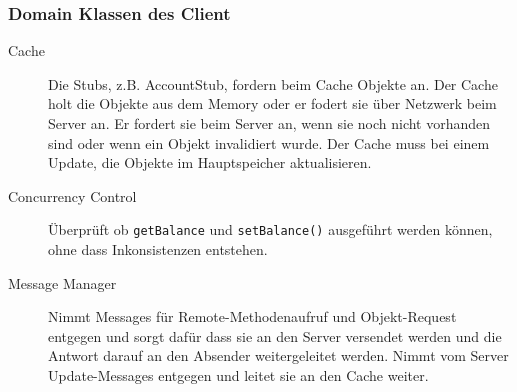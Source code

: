 \subsubsection{Domain Klassen des Client}
\label{sec:domain-klassen}

\begin{description}
\item[Cache] Die Stubs, z.B. AccountStub, fordern beim Cache Objekte an. Der Cache holt die Objekte aus dem Memory oder er fodert sie über Netzwerk beim Server an. Er fordert sie beim Server an, wenn sie noch nicht vorhanden sind oder wenn ein Objekt invalidiert wurde. Der Cache muss bei einem Update, die Objekte im Hauptspeicher aktualisieren.
\item[Concurrency Control] Überprüft ob \verb+getBalance+ und \verb+setBalance()+ ausgeführt werden können, ohne dass Inkonsistenzen entstehen.
\item[Message Manager] Nimmt Messages für Remote-Methodenaufruf und Objekt-Request entgegen und sorgt dafür dass sie an den Server versendet werden und die Antwort darauf an den Absender weitergeleitet werden. Nimmt vom Server Update-Messages entgegen und leitet sie an den Cache weiter. 
\end{description}